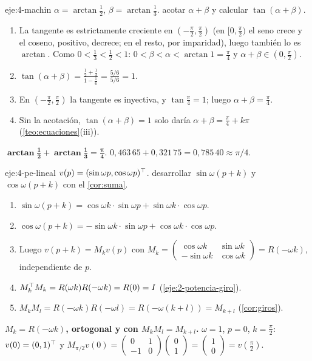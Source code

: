 \begin{solucion}{eje:4-machin}
\datos $\alpha=\arctan\frac12$, $\beta=\arctan\frac13$.
\planteamiento acotar $\alpha+\beta$ y calcular $\tan(\alpha+\beta)$.
\pasos
\begin{enumerate}[label=\arabic*.]
  \item La tangente es estrictamente creciente en $(-\frac{\pi}{2},\frac{\pi}{2})$ (en $[0,\frac{\pi}{2})$ el seno crece y el coseno, positivo, decrece; en el resto, por imparidad), luego también lo es $\arctan$. Como $0<\frac13<\frac12<1$: $0<\beta<\alpha<\arctan1=\frac{\pi}{4}$ y $\alpha+\beta\in(0,\frac{\pi}{2})$.
  \item $\tan(\alpha+\beta)=\frac{\frac12+\frac13}{1-\frac16}=\frac{5/6}{5/6}=1$.
  \item En $(-\frac{\pi}{2},\frac{\pi}{2})$ la tangente es inyectiva, y $\tan\frac{\pi}{4}=1$; luego $\alpha+\beta=\frac{\pi}{4}$.
  \item Sin la acotación, $\tan(\alpha+\beta)=1$ solo daría $\alpha+\beta=\frac{\pi}{4}+k\pi$ (\cref{teo:ecuaciones}(iii)).
\end{enumerate}
\resultado $\mathbf{\arctan\frac12+\arctan\frac13=\frac{\pi}{4}}$.
\comprobacion $0{,}463\,65+0{,}321\,75=0{,}785\,40\approx\pi/4$.
\end{solucion}

\begin{solucion}{eje:4-pe-lineal}
\datos $v(p)=(\sin\omega p,\cos\omega p)^{\top}$.
\planteamiento desarrollar $\sin\omega(p+k)$ y $\cos\omega(p+k)$ con el \cref{cor:suma}.
\pasos
\begin{enumerate}[label=\arabic*.]
  \item $\sin\omega(p+k)=\cos\omega k\cdot\sin\omega p+\sin\omega k\cdot\cos\omega p$.
  \item $\cos\omega(p+k)=-\sin\omega k\cdot\sin\omega p+\cos\omega k\cdot\cos\omega p$.
  \item Luego $v(p+k)=M_kv(p)$ con $M_k=\begin{pmatrix}\cos\omega k&\sin\omega k\\-\sin\omega k&\cos\omega k\end{pmatrix}=R(-\omega k)$, independiente de $p$.
  \item $M_k^{\top} M_k=R(\omega k)R(-\omega k)=R(0)=I$ (\cref{eje:2-potencia-giro}).
  \item $M_kM_l=R(-\omega k)R(-\omega l)=R(-\omega(k+l))=M_{k+l}$ (\cref{cor:giros}).
\end{enumerate}
\resultado \textbf{$M_k=R(-\omega k)$, ortogonal y con $M_kM_l=M_{k+l}$.}
\comprobacion $\omega=1$, $p=0$, $k=\frac{\pi}{2}$: $v(0)=(0,1)^{\top}$ y $M_{\pi/2}v(0)=\begin{pmatrix}0&1\\-1&0\end{pmatrix}\begin{pmatrix}0\\1\end{pmatrix}=\begin{pmatrix}1\\0\end{pmatrix}=v(\frac{\pi}{2})$.
\end{solucion}

